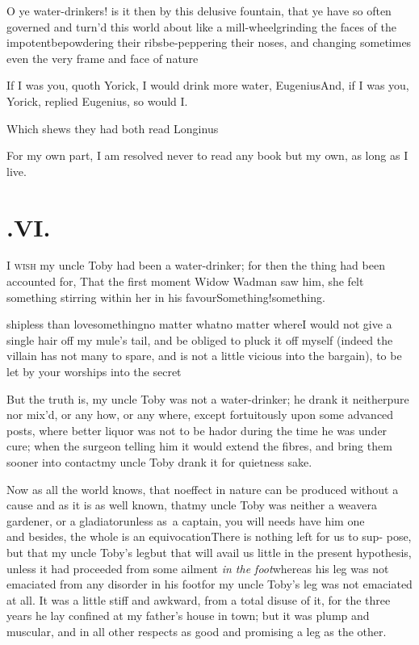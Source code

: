 \documentclass{article}
\begin{document}
O ye water-drinkers! is it then by this delusive fountain, that
ye have so often governed and turn’d this world about like a mill-wheel\tsk grinding the faces of the
impotent\tsk bepowdering their ribs\tsk be-peppering their
noses, and changing sometimes even the very frame and face of
nature\tsh{}

\tsk If I was you, quoth Yorick, I would drink more water,
Eugenius\tsk And, if I was you, Yorick, replied
Eugenius, so would I.

Which shews they had both read Longinus\tsh

For my own part, I am resolved never to read any book but my
own, as long as I live.

\vfill{}\eject
\section{.\enspace VI.}

\lettrine{I}{ wish} my uncle Toby had been
a water-drinker; for then the thing had been accounted for, That
the first moment Widow Wadman saw him, she felt something
stirring within her in his
favour\tsk Something!\tsk something.

\noindent
{}
ship\tsk less than
love\tsk some\-thing\tsk no matter what\tsk no matter
where\tsk I would not give a single hair off my mule’s tail, and
be obliged to pluck it off myself (indeed the villain has not many
to spare, and is not a little vicious into the bargain), to be let
by your worships into the secret\tsh{}

But the truth is, my uncle Toby was not a water-drinker;
he drank it neither\break pure nor mix’d, or any how, or any where,
except fortuitously upon some advanced posts, where better liquor
was not to be had\tsh or during the time he was under
cure; when the surgeon telling him it would extend the fibres, and
bring them sooner into contact\tsh my uncle Toby
drank it for quietness sake.

Now as all the world knows, that no\break effect in nature can be
produced without a cause and as it is as well known, that\break my uncle
Toby was neither a weaver\tsk\break a gardener, or a
gladiator\tsk unless as~a captain, you will needs have him
one\tsk\break
{}\\
and besides,
the whole is an equivocation\break\tsh There is nothing left for
us to sup- pose, but that my uncle Toby’s
leg\tsh but that will avail us little in the present
hypothesis, unless it had proceeded from some ailment \textit{in the
foot}\tsk whereas his leg was not emaciated from any disorder
in his foot\tsk for my uncle Toby’s leg was not
emaciated at all. It was a little stiff and awkward, from a total
disuse of it, for the three years he lay confined at my
father’s house in town; but it was plump and muscular, and in
all other respects as good and promising a leg as the other.
\end{document}
